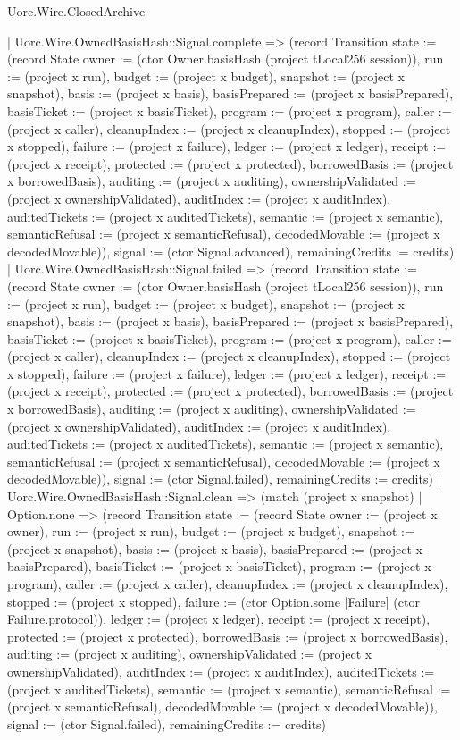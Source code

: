 \begin{lexlean}{Uorc.Wire.ClosedArchive}
\begin{semanticmodule}
{      | Uorc.Wire.OwnedBasisHash::Signal.complete => (record Transition {state := (record State {owner := (ctor Owner.basisHash (project tLocal256 session)), run := (project x run), budget := (project x budget), snapshot := (project x snapshot), basis := (project x basis), basisPrepared := (project x basisPrepared), basisTicket := (project x basisTicket), program := (project x program), caller := (project x caller), cleanupIndex := (project x cleanupIndex), stopped := (project x stopped), failure := (project x failure), ledger := (project x ledger), receipt := (project x receipt), protected := (project x protected), borrowedBasis := (project x borrowedBasis), auditing := (project x auditing), ownershipValidated := (project x ownershipValidated), auditIndex := (project x auditIndex), auditedTickets := (project x auditedTickets), semantic := (project x semantic), semanticRefusal := (project x semanticRefusal), decodedMovable := (project x decodedMovable)}), signal := (ctor Signal.advanced), remainingCredits := credits})
      | Uorc.Wire.OwnedBasisHash::Signal.failed => (record Transition {state := (record State {owner := (ctor Owner.basisHash (project tLocal256 session)), run := (project x run), budget := (project x budget), snapshot := (project x snapshot), basis := (project x basis), basisPrepared := (project x basisPrepared), basisTicket := (project x basisTicket), program := (project x program), caller := (project x caller), cleanupIndex := (project x cleanupIndex), stopped := (project x stopped), failure := (project x failure), ledger := (project x ledger), receipt := (project x receipt), protected := (project x protected), borrowedBasis := (project x borrowedBasis), auditing := (project x auditing), ownershipValidated := (project x ownershipValidated), auditIndex := (project x auditIndex), auditedTickets := (project x auditedTickets), semantic := (project x semantic), semanticRefusal := (project x semanticRefusal), decodedMovable := (project x decodedMovable)}), signal := (ctor Signal.failed), remainingCredits := credits})
      | Uorc.Wire.OwnedBasisHash::Signal.clean => (match (project x snapshot)
        | Option.none => (record Transition {state := (record State {owner := (project x owner), run := (project x run), budget := (project x budget), snapshot := (project x snapshot), basis := (project x basis), basisPrepared := (project x basisPrepared), basisTicket := (project x basisTicket), program := (project x program), caller := (project x caller), cleanupIndex := (project x cleanupIndex), stopped := (project x stopped), failure := (ctor Option.some [Failure] (ctor Failure.protocol)), ledger := (project x ledger), receipt := (project x receipt), protected := (project x protected), borrowedBasis := (project x borrowedBasis), auditing := (project x auditing), ownershipValidated := (project x ownershipValidated), auditIndex := (project x auditIndex), auditedTickets := (project x auditedTickets), semantic := (project x semantic), semanticRefusal := (project x semanticRefusal), decodedMovable := (project x decodedMovable)}), signal := (ctor Signal.failed), remainingCredits := credits})
}
\end{semanticmodule}
\end{lexlean}
